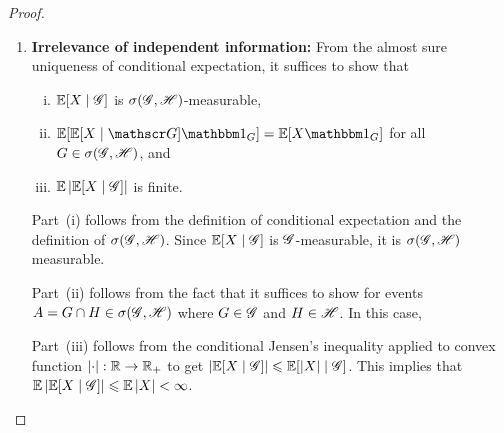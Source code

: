 \documentclass[letterpaper,10pt,english]{article}
\begin{document}
\begin{proof}
\begin{enumerate}
Part~(ii) follows from the fact that $\sH \subseteq \sG$, 
and hence any $H \in \sH$ belongs to $\sG$. 
Therefore, from the definition of conditional expectation, we have 

Part~(iii) follows from the conditional Jensen's inequality applied to convex function $\abs{\cdot}:\R\to\R_+$ to get $\abs{\E[X\mid\sH]} \le \E[\abs{X}\mid\sH]$, 
and hence $\E\abs{\E[X\mid\sH]} \le \E\abs{X} < \infty$. 

\item \textbf{Irrelevance of independent information:} 
From the almost sure uniqueness of conditional expectation, 
it suffices to show that 
\begin{enumerate}[(i)]
\item $\mathbb{E}[X\mid\mathscr{G}]$ is $\sigma(\mathscr{G},\mathscr{H})$-measurable, 
\item $\E[\E[X\mid\sG]\Ind{G}] = \E[X\Ind{G}]$ for all $G\in\sigma(\mathscr{G},\mathscr{H})$, and 
\item $\mathbb{E}\left\lvert\mathbb{E}[X\mid\mathscr{G}]\right\rvert$ is finite.  
\end{enumerate}

Part~(i) follows from the definition of conditional expectation and the definition of $\sigma(\mathscr{G},\mathscr{H})$. 
Since $\mathbb{E}[X\mid\mathscr{G}]$ is $\sG$-measurable, it is $\sigma(\mathscr{G},\mathscr{H})$ measurable. 


Part~(ii) follows from the fact that it suffices to show for events $A = G \cap H \in \sigma(\mathscr{G},\mathscr{H})$ 
where $G \in \mathscr{G}$ and $H \in \sH$. 
In this case,  

Part~(iii) follows from the conditional Jensen's inequality applied to convex function $\abs{\cdot}:\R\to\R_+$ to get $\left\lvert\mathbb{E}[X\mid\mathscr{G}]\right\rvert \leqslant \mathbb{E}[\left\lvert X\right\rvert\mid\mathscr{G}]$. 
This implies that $\mathbb{E}\left\lvert\mathbb{E}[X\mid\mathscr{G}]\right\rvert \leqslant \mathbb{E}\left\lvert X\right\rvert < \infty$. 


\end{enumerate}
\end{proof}
\end{document}

